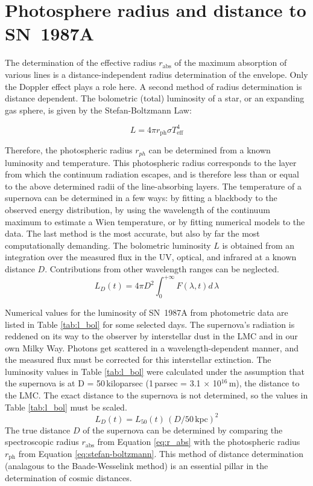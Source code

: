 \documentclass{article}
\begin{document}
\section{Photosphere radius and distance to SN~1987A}
The determination of the effective radius $r_{\text{abs}}$ of the maximum absorption of various lines is a distance-independent radius determination of the envelope.
Only the Doppler effect plays a role here.
A second method of radius determination is distance dependent.
The bolometric (total) luminosity of a star, or an expanding gas sphere, is given by the Stefan-Boltzmann Law:

\begin{equation}
    L = 4 \pi r_{\text{ph}} \sigma T^4_{\text{eff}}
    \label{eq:stefan-boltzmann}
\end{equation}

Therefore, the photospheric radius $r_{ph}$ can be determined from a known luminosity and temperature.
This photospheric radius corresponds to the layer from which the continuum radiation escapes, and is therefore less than or equal to the above determined radii of the line-absorbing layers.
The temperature of a supernova can be determined in a few ways: by fitting a blackbody to the observed energy distribution, by using the wavelength of the continuum maximum to estimate a Wien temperature, or by fitting numerical models to the data. 
The last method is the most accurate, but also by far the most computationally demanding.
The bolometric luminosity $L$ is obtained from an integration over the measured flux in the UV, optical, and infrared at a known distance $D$. 
Contributions from other wavelength ranges can be neglected.
\begin{equation}
    L_D(t) = 4 \pi D^2 \int_0^{+\infty} F(\lambda,t) d\,\lambda
\end{equation}

Numerical values for the luminosity of SN~1987A from photometric data are listed in Table \ref{tab:l_bol} for some selected days.
The supernova's radiation is reddened on its way to the observer by interstellar dust in the LMC and in our own Milky Way.
Photons get scattered in a wavelength-dependent manner, and the measured flux must be corrected for this interstellar extinction.
The luminosity values in Table \ref{tab:l_bol} were calculated under the assumption that the supernova is at D = 50\,kiloparsec (1\,parsec = 3.1 $\times$ 10$^{16}$\,m), the distance to the LMC.
The exact distance to the supernova is not determined, so the values in Table \ref{tab:l_bol} must be scaled.
\begin{equation}
    L_D(t) = L_{50}(t)\,(D/50\,\text{kpc})^2
\end{equation}
The true distance $D$ of the supernova can be determined by comparing the spectroscopic radius $r_\text{abs}$ from Equation \ref{eq:r_abs} with the photospheric radius $r_\text{ph}$ from Equation \ref{eq:stefan-boltzmann}.
This method of distance determination (analagous to the Baade-Wesselink method) is an essential pillar in the determination of cosmic distances.
\end{document}
